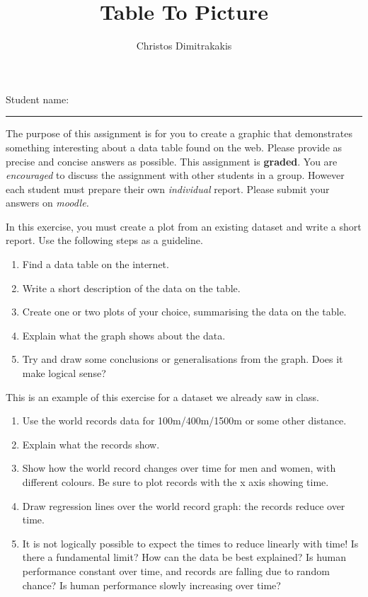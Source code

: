 \documentclass[a4paper]{article}
\title{Table To Picture}
\author{Christos Dimitrakakis}
\begin{document}
\maketitle

{\Large Student name:} \vspace{0.5em} \hrule \vspace{1em}

The purpose of this assignment is for you to create a graphic that
demonstrates something interesting about a data table found on the
web.  Please provide as precise and concise answers as possible. This
assignment is \textbf{graded}. You are \emph{encouraged} to discuss
the assignment with other students in a group. However each student
must prepare their own \emph{individual} report.  Please submit your
answers on \emph{moodle.}

\begin{exercise}
  In this exercise, you must create a plot from an existing dataset and write a short report. Use the following steps as a guideline.
  \begin{enumerate}
  \item Find a data table on the internet. 
  \item Write a short description of the data on the table.
  \item Create one or two plots of your choice, summarising the data on the table.
  \item Explain what the graph shows about the data.
  \item Try and draw some conclusions or generalisations from the graph. Does it make logical sense?
  \end{enumerate}
\end{exercise}

\begin{example}
  This is an example of this exercise for a dataset we already saw in class. 
  \begin{enumerate}
  \item Use the world records data for 100m/400m/1500m or some other distance.
  \item Explain what the records show.
  \item Show how the world record changes over time for men and women,
    with different colours. Be sure to plot records with the x axis
    showing time.
  \item Draw regression lines over the world record graph: the records reduce over time.
  \item It is not logically possible to expect the times to reduce linearly with time! Is there a fundamental limit? How can the data be best explained? Is human performance constant over time, and records are falling due to random chance? Is human performance slowly increasing over time?
  \end{enumerate}
\end{example}
\end{document}
